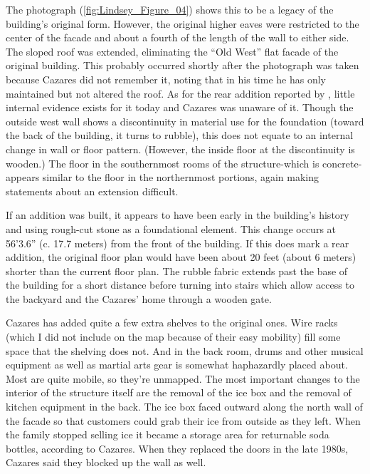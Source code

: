 The photograph (\cref{fig:Lindsey_Figure_04}) shows this to be a legacy of the building's original form. However, the original higher eaves were restricted to the center of the facade and about a fourth of the length of the wall to either side. The sloped roof was extended, eliminating the “Old West” flat facade of the original building. This probably occurred shortly after the photograph was taken because Cazares did not remember it, noting that in his time he has only maintained but not altered the roof.  As for the rear addition reported by \textcite[75-76]{hardy}, little internal evidence exists for it today and Cazares was unaware of it. Though the outside west wall shows a discontinuity in material use for the foundation (toward the back of the building, it turns to rubble), this does not equate to an internal change in wall or floor pattern. (However, the inside floor at the discontinuity is wooden.) The floor in the southernmost rooms of the structure-which is concrete-appears similar to the floor in the northernmost portions, again making statements about an extension difficult.


If an addition was built, it appears to have been early in the building's history and using rough-cut stone as a foundational element. This change occurs at 56'3.6” (c. \num{17.7} meters) from the front of the building. If this does mark a rear addition, the original floor plan would have been about \num{20} feet (about \num{6} meters) shorter than the current floor plan. The rubble fabric extends past the base of the building for a short distance before turning into stairs which allow access to the backyard and the Cazares’ home through a wooden gate.

Cazares has added quite a few extra shelves to the original ones. Wire racks (which I did not include on the map because of their easy mobility) fill some space that the shelving does not. And in the back room, drums and other musical equipment as well as martial arts gear is somewhat haphazardly placed about. Most are quite mobile, so they're unmapped. The most important changes to the interior of the structure itself are the removal of the ice box and the removal of kitchen equipment in the back. The ice box faced outward along the north wall of the facade so that customers could grab their ice from outside as they left. When the family stopped selling ice it became a storage area for returnable soda bottles, according to Cazares. When they replaced the doors in the late 1980s, Cazares said they blocked up the wall as well.

